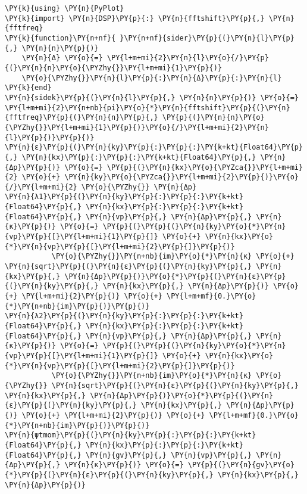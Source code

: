 \begin{Verbatim}[commandchars=\\\{\}]
\PY{k}{using} \PY{n}{PyPlot}
\PY{k}{import} \PY{n}{DSP}\PY{p}{:} \PY{n}{fftshift}\PY{p}{,} \PY{n}{fftfreq}
\PY{k}{function}\PY{n+nf}{ }\PY{n+nf}{sider}\PY{p}{(}\PY{n}{l}\PY{p}{,} \PY{n}{n}\PY{p}{)}
    \PY{n}{Δ} \PY{o}{=} \PY{l+m+mi}{2}\PY{n}{l}\PY{o}{/}\PY{p}{(}\PY{n}{n}\PY{o}{\PYZhy{}}\PY{l+m+mi}{1}\PY{p}{)}
    \PY{o}{\PYZhy{}}\PY{n}{l}\PY{p}{:}\PY{n}{Δ}\PY{p}{:}\PY{n}{l}
\PY{k}{end}
\PY{n}{sidek}\PY{p}{(}\PY{n}{l}\PY{p}{,} \PY{n}{n}\PY{p}{)} \PY{o}{=} \PY{l+m+mi}{2}\PY{n+nb}{pi}\PY{o}{*}\PY{n}{fftshift}\PY{p}{(}\PY{n}{fftfreq}\PY{p}{(}\PY{n}{n}\PY{p}{,} \PY{p}{(}\PY{n}{n}\PY{o}{\PYZhy{}}\PY{l+m+mi}{1}\PY{p}{)}\PY{o}{/}\PY{l+m+mi}{2}\PY{n}{l}\PY{p}{)}\PY{p}{)}
\PY{n}{ε}\PY{p}{(}\PY{n}{ky}\PY{p}{:}\PY{p}{:}\PY{k+kt}{Float64}\PY{p}{,} \PY{n}{kx}\PY{p}{:}\PY{p}{:}\PY{k+kt}{Float64}\PY{p}{,} \PY{n}{Δp}\PY{p}{)} \PY{o}{=} \PY{p}{(}\PY{n}{kx}\PY{o}{\PYZca{}}\PY{l+m+mi}{2} \PY{o}{+} \PY{n}{ky}\PY{o}{\PYZca{}}\PY{l+m+mi}{2}\PY{p}{)}\PY{o}{/}\PY{l+m+mi}{2} \PY{o}{\PYZhy{}} \PY{n}{Δp}
\PY{n}{λ1}\PY{p}{(}\PY{n}{ky}\PY{p}{:}\PY{p}{:}\PY{k+kt}{Float64}\PY{p}{,} \PY{n}{kx}\PY{p}{:}\PY{p}{:}\PY{k+kt}{Float64}\PY{p}{,} \PY{n}{vp}\PY{p}{,} \PY{n}{Δp}\PY{p}{,} \PY{n}{κ}\PY{p}{)} \PY{o}{=} \PY{p}{(}\PY{p}{(}\PY{n}{ky}\PY{o}{*}\PY{n}{vp}\PY{p}{[}\PY{l+m+mi}{1}\PY{p}{]} \PY{o}{+} \PY{n}{kx}\PY{o}{*}\PY{n}{vp}\PY{p}{[}\PY{l+m+mi}{2}\PY{p}{]}\PY{p}{)}
           \PY{o}{\PYZhy{}}\PY{n+nb}{im}\PY{o}{*}\PY{n}{κ} \PY{o}{+} \PY{n}{sqrt}\PY{p}{(}\PY{n}{ε}\PY{p}{(}\PY{n}{ky}\PY{p}{,} \PY{n}{kx}\PY{p}{,} \PY{n}{Δp}\PY{p}{)}\PY{o}{*}\PY{p}{(}\PY{n}{ε}\PY{p}{(}\PY{n}{ky}\PY{p}{,} \PY{n}{kx}\PY{p}{,} \PY{n}{Δp}\PY{p}{)} \PY{o}{+} \PY{l+m+mi}{2}\PY{p}{)} \PY{o}{+} \PY{l+m+mf}{0.}\PY{o}{*}\PY{n+nb}{im}\PY{p}{)}\PY{p}{)}
\PY{n}{λ2}\PY{p}{(}\PY{n}{ky}\PY{p}{:}\PY{p}{:}\PY{k+kt}{Float64}\PY{p}{,} \PY{n}{kx}\PY{p}{:}\PY{p}{:}\PY{k+kt}{Float64}\PY{p}{,} \PY{n}{vp}\PY{p}{,} \PY{n}{Δp}\PY{p}{,} \PY{n}{κ}\PY{p}{)} \PY{o}{=} \PY{p}{(}\PY{p}{(}\PY{n}{ky}\PY{o}{*}\PY{n}{vp}\PY{p}{[}\PY{l+m+mi}{1}\PY{p}{]} \PY{o}{+} \PY{n}{kx}\PY{o}{*}\PY{n}{vp}\PY{p}{[}\PY{l+m+mi}{2}\PY{p}{]}\PY{p}{)}
           \PY{o}{\PYZhy{}}\PY{n+nb}{im}\PY{o}{*}\PY{n}{κ} \PY{o}{\PYZhy{}} \PY{n}{sqrt}\PY{p}{(}\PY{n}{ε}\PY{p}{(}\PY{n}{ky}\PY{p}{,} \PY{n}{kx}\PY{p}{,} \PY{n}{Δp}\PY{p}{)}\PY{o}{*}\PY{p}{(}\PY{n}{ε}\PY{p}{(}\PY{n}{ky}\PY{p}{,} \PY{n}{kx}\PY{p}{,} \PY{n}{Δp}\PY{p}{)} \PY{o}{+} \PY{l+m+mi}{2}\PY{p}{)} \PY{o}{+} \PY{l+m+mf}{0.}\PY{o}{*}\PY{n+nb}{im}\PY{p}{)}\PY{p}{)}
\PY{n}{ψtmom}\PY{p}{(}\PY{n}{ky}\PY{p}{:}\PY{p}{:}\PY{k+kt}{Float64}\PY{p}{,} \PY{n}{kx}\PY{p}{:}\PY{p}{:}\PY{k+kt}{Float64}\PY{p}{,} \PY{n}{gv}\PY{p}{,} \PY{n}{vp}\PY{p}{,} \PY{n}{Δp}\PY{p}{,} \PY{n}{κ}\PY{p}{)} \PY{o}{=} \PY{p}{(}\PY{n}{gv}\PY{o}{*}\PY{p}{(}\PY{n}{ε}\PY{p}{(}\PY{n}{ky}\PY{p}{,} \PY{n}{kx}\PY{p}{,} \PY{n}{Δp}\PY{p}{)}

\end{Verbatim}
